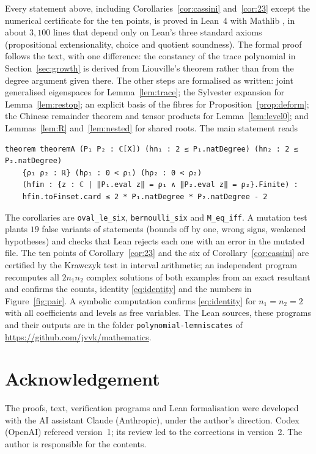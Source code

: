 \documentclass[11pt]{amsart}
\theoremstyle{remark}\newtheorem{remark}[theorem]{Remark}
\theoremstyle{definition}\newtheorem{example}[theorem]{Example}
\begin{document}
Every statement above, including Corollaries~\ref{cor:cassini} and~\ref{cor:23} except the numerical certificate for
the ten points, is proved in Lean~4 with Mathlib \cite{lean,mathlib}, in about $3{,}100$ lines that depend only on
Lean's three standard axioms (propositional extensionality, choice and quotient soundness). The formal proof follows
the text, with one difference: the constancy of the trace polynomial in Section~\ref{sec:growth} is derived from
Liouville's theorem rather than from the degree argument given there. The other steps are formalised as written: joint generalised eigenspaces for Lemma~\ref{lem:trace}; the Sylvester expansion for
Lemma~\ref{lem:restop}; an explicit basis of the fibres for Proposition~\ref{prop:deform}; the Chinese remainder
theorem and tensor products for Lemma~\ref{lem:level0}; and Lemmas~\ref{lem:R} and~\ref{lem:nested} for shared
roots. The main statement reads
\begin{small}\begin{verbatim}
theorem theoremA (P₁ P₂ : ℂ[X]) (hn₁ : 2 ≤ P₁.natDegree) (hn₂ : 2 ≤ P₂.natDegree)
    {ρ₁ ρ₂ : ℝ} (hρ₁ : 0 < ρ₁) (hρ₂ : 0 < ρ₂)
    (hfin : {z : ℂ | ‖P₁.eval z‖ = ρ₁ ∧ ‖P₂.eval z‖ = ρ₂}.Finite) :
    hfin.toFinset.card ≤ 2 * P₁.natDegree * P₂.natDegree - 2
\end{verbatim}\end{small}
The corollaries are \texttt{oval\_le\_six}, \texttt{bernoulli\_six} and \texttt{M\_eq\_iff}. A mutation test plants
$19$ false variants of statements (bounds off by one, wrong signs, weakened hypotheses) and checks that Lean rejects each one with an error in the mutated file. The ten points of Corollary~\ref{cor:23} and the six of Corollary~\ref{cor:cassini} are certified by
the Krawczyk test in interval arithmetic; an independent program recomputes all $2n_1n_2$ complex solutions of both
examples from an exact resultant and confirms the counts, identity \eqref{eq:identity} and the numbers in
Figure~\ref{fig:pair}. A symbolic computation confirms \eqref{eq:identity} for $n_1=n_2=2$ with all coefficients and
levels as free variables. The Lean sources, these programs and their outputs are in the folder
\texttt{polynomial-lemniscates} of \url{https://github.com/jvvk/mathematics}.

\section*{Acknowledgement}
The proofs, text, verification programs and Lean formalisation were developed with the AI assistant Claude
(Anthropic), under the author's direction. Codex (OpenAI) refereed version~1; its review led to the corrections in
version~2. The author is responsible for the contents.
\end{document}
